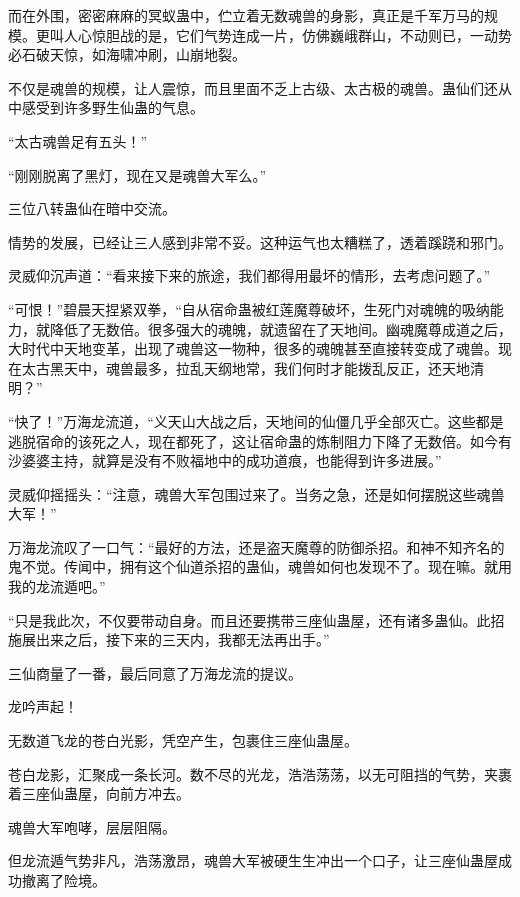 
\begin{this_body}

而在外围，密密麻麻的冥蚁蛊中，伫立着无数魂兽的身影，真正是千军万马的规模。更叫人心惊胆战的是，它们气势连成一片，仿佛巍峨群山，不动则已，一动势必石破天惊，如海啸冲刷，山崩地裂。

不仅是魂兽的规模，让人震惊，而且里面不乏上古级、太古极的魂兽。蛊仙们还从中感受到许多野生仙蛊的气息。

“太古魂兽足有五头！”

“刚刚脱离了黑灯，现在又是魂兽大军么。”

三位八转蛊仙在暗中交流。

情势的发展，已经让三人感到非常不妥。这种运气也太糟糕了，透着蹊跷和邪门。

灵威仰沉声道：“看来接下来的旅途，我们都得用最坏的情形，去考虑问题了。”

“可恨！”碧晨天捏紧双拳，“自从宿命蛊被红莲魔尊破坏，生死门对魂魄的吸纳能力，就降低了无数倍。很多强大的魂魄，就遗留在了天地间。幽魂魔尊成道之后，大时代中天地变革，出现了魂兽这一物种，很多的魂魄甚至直接转变成了魂兽。现在太古黑天中，魂兽最多，拉乱天纲地常，我们何时才能拨乱反正，还天地清明？”

“快了！”万海龙流道，“义天山大战之后，天地间的仙僵几乎全部灭亡。这些都是逃脱宿命的该死之人，现在都死了，这让宿命蛊的炼制阻力下降了无数倍。如今有沙婆婆主持，就算是没有不败福地中的成功道痕，也能得到许多进展。”

灵威仰摇摇头：“注意，魂兽大军包围过来了。当务之急，还是如何摆脱这些魂兽大军！”

万海龙流叹了一口气：“最好的方法，还是盗天魔尊的防御杀招。和神不知齐名的鬼不觉。传闻中，拥有这个仙道杀招的蛊仙，魂兽如何也发现不了。现在嘛。就用我的龙流遁吧。”

“只是我此次，不仅要带动自身。而且还要携带三座仙蛊屋，还有诸多蛊仙。此招施展出来之后，接下来的三天内，我都无法再出手。”

三仙商量了一番，最后同意了万海龙流的提议。

龙吟声起！

无数道飞龙的苍白光影，凭空产生，包裹住三座仙蛊屋。

苍白龙影，汇聚成一条长河。数不尽的光龙，浩浩荡荡，以无可阻挡的气势，夹裹着三座仙蛊屋，向前方冲去。

魂兽大军咆哮，层层阻隔。

但龙流遁气势非凡，浩荡激昂，魂兽大军被硬生生冲出一个口子，让三座仙蛊屋成功撤离了险境。


\end{this_body}
